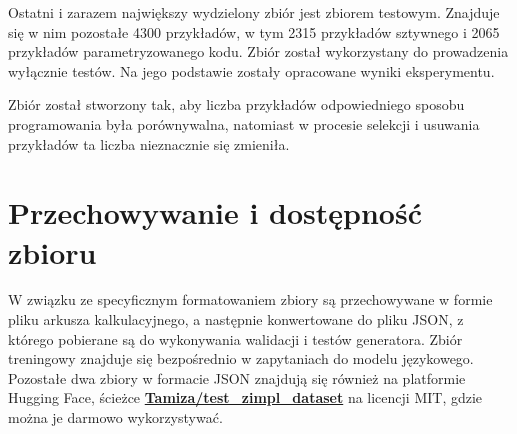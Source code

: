 Ostatni i zarazem największy wydzielony zbiór jest zbiorem testowym. Znajduje się w nim pozostałe 4300 przykładów, w tym 2315 przykładów sztywnego i 2065 przykładów parametryzowanego kodu. Zbiór został wykorzystany do prowadzenia wyłącznie testów. Na jego podstawie zostały opracowane wyniki eksperymentu.

Zbiór został stworzony tak, aby liczba przykładów odpowiedniego sposobu programowania była porównywalna, natomiast w procesie selekcji i usuwania przykładów ta liczba nieznacznie się zmieniła.

\section{Przechowywanie i dostępność zbioru}

W związku ze specyficznym formatowaniem zbiory są przechowywane w formie pliku arkusza kalkulacyjnego, a następnie konwertowane do pliku JSON, z którego pobierane są do wykonywania walidacji i testów generatora. Zbiór treningowy znajduje się bezpośrednio w zapytaniach do modelu językowego. Pozostałe dwa zbiory w formacie JSON znajdują się również na platformie Hugging Face, ścieżce \href{https://huggingface.co/datasets/Tamiza/test_zimpl_dataset}{\textbf{Tamiza/test\_zimpl\_dataset}} na licencji MIT, gdzie można je darmowo wykorzystywać.